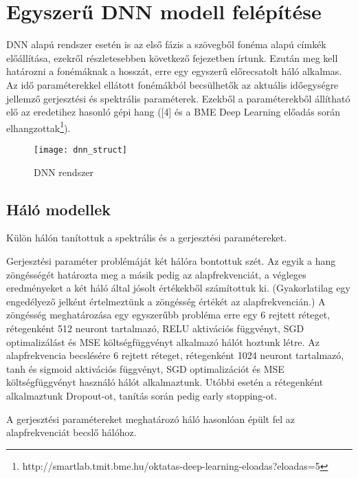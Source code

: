\section{Egyszerű DNN modell felépítése}

DNN alapú rendszer esetén is az első fázis a szövegből fonéma alapú címkék előállítása, ezekről részletesebben következő fejezetben írtunk. Ezután meg kell határozni a fonémáknak a hosszát, erre egy egyszerű előrecsatolt háló alkalmas. Az idő paraméterekkel ellátott fonémákból becsülhetők az aktuális időegységre jellemző gerjesztési és spektrális paraméterek. Ezekből a paraméterekből állítható elő az eredetihez hasonló gépi hang ([4] és a BME Deep Learning előadás során elhangzottak\footnote{http://smartlab.tmit.bme.hu/oktatas-deep-learning-eloadas?eloadas=5}).

\begin{figure}[h]
	\texttt{[image: dnn\_struct]}
	\caption{DNN rendszer}\par\medskip\centering
\end{figure}

\subsection{Háló modellek}
Külön hálón tanítottuk a spektrális és a gerjesztési paramétereket. 

Gerjesztési paraméter problémáját két hálóra bontottuk szét. Az egyik a hang zöngésségét határozta meg a másik pedig az alapfrekvenciát, a végleges eredményeket a két háló által jósolt értékekből számítottuk ki. (Gyakorlatilag egy engedélyező jelként értelmeztünk a zöngésség értékét az alapfrekvencián.) A zöngésség meghatározása egy egyszerűbb probléma erre  egy 6 rejtett réteget, rétegenként 512 neuront tartalmazó, RELU aktivációs függvényt, SGD optimalizálást és MSE költségfüggvényt alkalmazó hálót hoztunk létre. Az alapfrekvencia becslésére 6 rejtett réteget, rétegenként 1024 neuront tartalmazó, tanh és sigmoid aktivációs függvényt, SGD optimalizációt és MSE költségfüggvényt használó hálót alkalmaztunk. Utóbbi esetén a rétegenként alkalmaztunk Dropout-ot, tanítás során pedig early stopping-ot.

A gerjesztési paramétereket meghatározó háló hasonlóan épült fel az alapfrekvenciát becslő hálóhoz.

